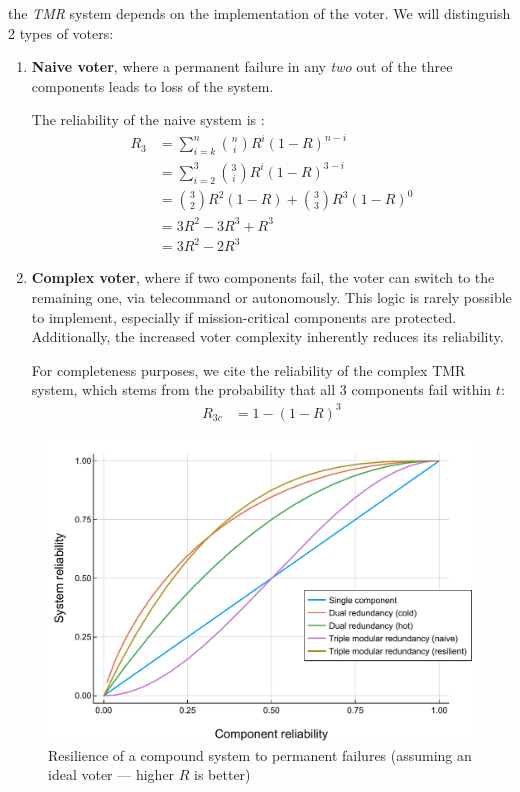 \documentclass[a4paper,nobib]{tufte-book}
\begin{document}
 
 the \emph{\ac{TMR}} system depends on the implementation of the voter. We will distinguish 2 types of voters:
\begin{enumerate}
	\item \textbf{Naive voter}, where a permanent failure in any \emph{two} out of the three components leads to loss of the system.
	
	The reliability of the naive system is \autocite[31]{birolini_reliability_engineering_2004}:
	\begin{align}
	R_3 &= \sum_{i=k}^{n} \binom{n}{i} R^i (1-R)^{n-i}\nonumber\\
	&= \sum_{i=2}^{3} \binom{3}{i} R^i (1-R)^{3-i} \nonumber\\
	&= \binom{3}{2} R^2 (1-R) + \binom{3}{3} R^3 (1-R)^0 \nonumber\\
	&= 3R^2 - 3R^3 + R^3 \nonumber\\
	&= 3R^2 - 2R^3
	\label{eq:tmr}
	\end{align}
	
	\item \textbf{Complex voter}, where if two components fail, the voter can switch to the remaining one, via telecommand or autonomously. This logic is rarely possible to implement, especially if mission-critical components are protected. Additionally, the increased voter complexity inherently reduces its reliability.
	
	For completeness purposes, we cite the reliability of the complex \acs{TMR} system, which stems from the probability that all 3 components fail within \( t \):
	\begin{align}
	R_{3c} &= 1 - (1 - R)^3
	\label{eq:tmr_complex}
	\end{align}
\end{enumerate}


\begin{figure}
	\centering
	\includegraphics{analysis/reliability_norepair_en}
	\caption[Resilience of a compound system to permanent failures (assuming an ideal voter)]{Resilience of a compound system to permanent failures (assuming an ideal voter --- higher \(R\) is better)}
	\label{fig:reliability_norepair}
\end{figure}
\end{document}
